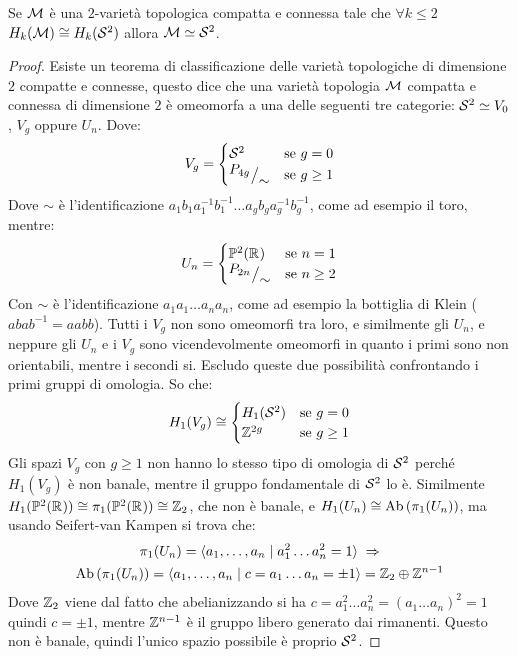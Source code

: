 \begin{proposition}
  Se $ \mathcal{M} $ è una $ 2 $-varietà topologica compatta e connessa tale che $ \forall k \leq 2 $
  $ H_k(\mathcal{M}) \cong H_k(\mathcal{S}^{2}) $ allora $ \mathcal{M} \simeq \mathcal{S}^{2} $.
\end{proposition}
\begin{proof}
  Esiste un teorema di classificazione delle varietà topologiche di dimensione
  $ 2 $ compatte e connesse, questo dice che una varietà topologia $ \mathcal{M} $
  compatta e connessa di dimensione $ 2 $ è omeomorfa a una delle seguenti tre
  categorie: $ \mathcal{S}^{2} \simeq V_0 $, $ V_g $ oppure $ U_n $. Dove:
  \[
    V_g =
    \begin{cases}
      \mathcal{S}^{2} & \text{se } g = 0 \\
      {^{\textstyle P_{4g}}\big/_{\textstyle \sim}} & \text{se } g \geq 1
    \end{cases}
  \]
  Dove $ \sim $ è l'identificazione $ a_1 b_1 a_1^{-1}b_1^{-1}\dots a_g b_g a_g^{-1}b_g^{-1} $,
  come ad esempio il toro, mentre:
  \[
    U_n =
    \begin{cases}
      \mathbb{P}^2(\mathbb{R}^{}) & \text{se } n = 1 \\
      {^{\textstyle P_{2n}}\big/_{\textstyle \sim}} & \text{se } n \geq 2
    \end{cases}
  \]
  Con $ \sim $ è l'identificazione $ a_1 a_1 \dots a_n a_n $, come ad esempio la
  bottiglia di Klein ($ abab^{-1} = aabb $). Tutti i $ V_g $ non sono omeomorfi
  tra loro, e similmente gli $ U_n $, e neppure gli $ U_n $ e i $ V_g $ sono
  vicendevolmente omeomorfi in quanto i primi sono non orientabili, mentre i
  secondi si. Escludo queste due possibilità confrontando i primi gruppi di
  omologia. So che:
  \[
    H_1(V_g) \cong
    \begin{cases}
      H_1(\mathcal{S}^{2}) & \text{se } g = 0 \\
      \mathbb{Z}^{2g} & \text{se } g \geq 1
    \end{cases}
  \]
  Gli spazi $ V_g $ con $ g \geq 1 $ non hanno lo stesso tipo di omologia di
  $ \mathcal{S}^{2} $ perché $ H_1(V_g) $ è non banale, mentre il gruppo fondamentale di
  $ \mathcal{S}^{2} $ lo è. Similmente
  $ H_1(\mathbb{P}^2(\mathbb{R}^{})) \cong \pi_1(\mathbb{P}^2(\mathbb{R}^{})) \cong \mathbb{Z}_2 $, che non è
  banale, e $ H_1(U_n) \cong \mathrm{Ab}\left( \pi_1(U_n) \right) $, ma usando Seifert-van Kampen si trova che:
  \begin{gather*}
    \pi_1(U_n) = \langle a_1, \dots, a_n \; | \; a_1^2\dots a_n^2 = 1 \rangle \; \Rightarrow \\
    \mathrm{Ab}\left( \pi_1(U_n) \right) = \langle a_1, \dots, a_n \; | \;  c = a_1 \dots a_n = \pm 1 \rangle = \mathbb{Z}_2 \oplus \mathbb{Z}^{n-1}
  \end{gather*}
  Dove $ \mathbb{Z}_2 $ viene dal fatto che abelianizzando si ha
  $ c = a_1^2\dots a_n^2 = (a_1 \dots a_n)^2 = 1 $ quindi $ c = \pm 1 $, mentre
  $ \mathbb{Z}^{n-1} $ è il gruppo libero generato dai rimanenti. Questo non è banale,
  quindi l'unico spazio possibile è proprio $ \mathcal{S}^{2} $.
\end{proof}
